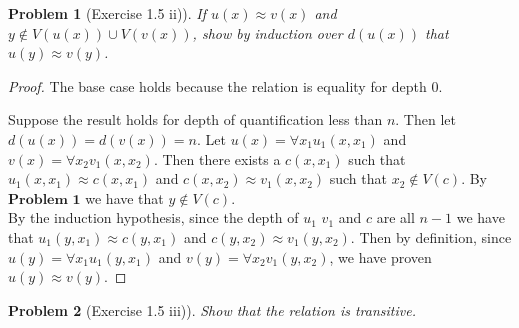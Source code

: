 \documentclass{article}
\theoremstyle{problemstyle}
\newtheorem{problem}{Problem}
\theoremstyle{lemmastyle}
\theoremstyle{theoremstyle}
\begin{document}
% 
% 
% 

\begin{problem}[Exercise 1.5 ii)]
If $u(x) \approx v(x)$ and $y \notin V(u(x)) \cup V(v(x))$, show by induction over $d(u(x))$ that $u(y) \approx v(y)$.
\end{problem}

\begin{proof}
The base case holds because the relation is equality for depth $0$. 

Suppose the result holds for depth of quantification less than $n$. Then let $d(u(x)) = d(v(x)) = n$.  Let $u(x) = \forall x_1 u_1(x,x_1)$ and $v(x) = \forall x_2 v_1(x,x_2)$. Then there exists a $c(x,x_1)$  such that $u_1(x,x_1) \approx c(x,x_1)$ and $c(x,x_2) \approx v_1(x,x_2)$ such that $x_2 \notin V(c)$. By $\textbf{Problem 1}$ we have that $y \notin V(c)$.\\

By the induction hypothesis, since the depth of $u_1$ $v_1$ and $c$ are all $n-1$ we have that $u_1(y,x_1) \approx c(y,x_1)$ and $c(y,x_2) \approx v_1(y,x_2)$. Then by definition, since $u(y) = \forall x_1 u_1(y,x_1)$ and $v(y) = \forall x_2 v_1(y,x_2)$, we have proven $u(y) \approx v(y)$.
\end{proof}

\begin{problem}[Exercise 1.5 iii)]
Show that the relation is transitive. 
\end{problem}
\end{document}
